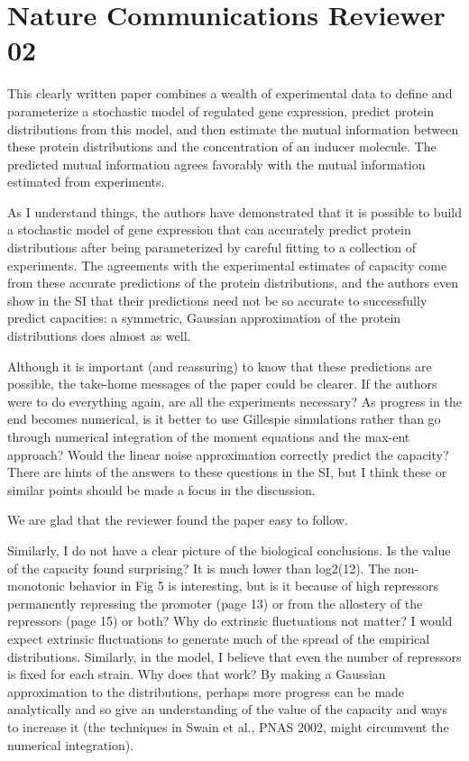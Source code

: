 \section{Nature Communications Reviewer 02}

This clearly written paper combines a wealth of experimental data to define and
parameterize a stochastic model of regulated gene expression, predict protein
distributions from this model, and then estimate the mutual information between
these protein distributions and the concentration of an inducer molecule. The
predicted mutual information agrees favorably with the mutual information
estimated from experiments.

\begin{tcolorbox}
As I understand things, the authors have demonstrated that it is possible to
build a stochastic model of gene expression that can accurately predict protein
distributions after being parameterized by careful fitting to a collection of
experiments. The agreements with the experimental estimates of capacity come
from these accurate predictions of the protein distributions, and the authors
even show in the SI that their predictions need not be so accurate to
successfully predict capacities: a symmetric, Gaussian approximation of the
protein distributions does almost as well.

Although it is important (and reassuring) to know that these predictions are
possible, the take-home messages of the paper could be clearer. If the authors
were to do everything again, are all the experiments necessary? As progress in
the end becomes numerical, is it better to use Gillespie simulations rather than
go through numerical integration of the moment equations and the max-ent
approach? Would the linear noise approximation correctly predict the capacity?
There are hints of the answers to these questions in the SI, but I think these
or similar points should be made a focus in the discussion.
\end{tcolorbox}
We are glad that the reviewer found the paper easy to follow.


\begin{tcolorbox}
Similarly, I do not have a clear picture of the biological conclusions. Is the
value of the capacity found surprising? It is much lower than log2(12). The
non-monotonic behavior in Fig 5 is interesting, but is it because of high
repressors permanently repressing the promoter (page 13) or from the allostery
of the repressors (page 15) or both? Why do extrinsic fluctuations not matter? I
would expect extrinsic fluctuations to generate much of the spread of the
empirical distributions. Similarly, in the model, I believe that even the number
of repressors is fixed for each strain. Why does that work? By making a Gaussian
approximation to the distributions, perhaps more progress can be made
analytically and so give an understanding of the value of the capacity and ways
to increase it (the techniques in Swain et al., PNAS 2002, might circumvent the
numerical integration).
\end{tcolorbox}

